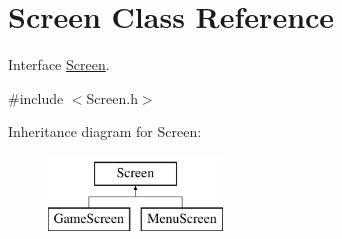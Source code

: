 \hypertarget{classScreen}{\section{Screen Class Reference}
\label{classScreen}
}


Interface \hyperlink{classScreen}{Screen}.  




{\ttfamily \#include $<$Screen.\-h$>$}

Inheritance diagram for Screen\-:\begin{figure}[H]
\begin{center}
\leavevmode
\includegraphics[height=2.000000cm]{classScreen}
\end{center}
\end{figure}
